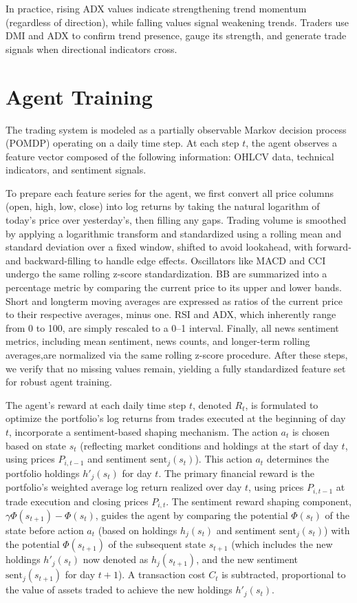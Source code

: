 In practice, rising \gls{ADX} values indicate strengthening trend momentum (regardless of direction), while falling values signal weakening trends. Traders use \gls{DMI} and \gls{ADX} to confirm trend presence, gauge its strength, and generate trade signals when directional indicators cross.

\section{Agent Training}
The trading system is modeled as a partially observable Markov decision process (POMDP) operating on a daily time step. At each step \(t\), the agent observes a feature vector composed of the following information: \gls{OHLCV} data, technical indicators, and sentiment signals. 

To prepare each feature series for the agent, we first convert all price columns (open, high, low, close) into log returns by taking the natural logarithm of today’s price over yesterday’s, then filling any gaps. Trading volume is smoothed by applying a logarithmic transform and standardized using a rolling mean and standard deviation over a fixed window, shifted to avoid lookahead, with forward- and backward-filling to handle edge effects. Oscillators like \gls{MACD} and \gls{CCI} undergo the same rolling z-score standardization. \gls{BB} are summarized into a percentage metric by comparing the current price to its upper and lower bands. Short and longterm moving averages are expressed as ratios of the current price to their respective averages, minus one. \gls{RSI} and \gls{ADX}, which inherently range from 0 to 100, are simply rescaled to a 0–1 interval. Finally, all news sentiment metrics, including mean sentiment, news counts, and longer-term rolling averages,are normalized via the same rolling z-score procedure. After these steps, we verify that no missing values remain, yielding a fully standardized feature set for robust agent training.

The agent's reward at each daily time step \(t\), denoted \(R_t\), is formulated to optimize the portfolio's log returns from trades executed at the beginning of day \(t\), incorporate a sentiment-based shaping mechanism. The action \(a_t\) is chosen based on state \(s_t\) (reflecting market conditions and holdings at the start of day \(t\), using prices \(P_{i,t-1}\) and sentiment \(\text{sent}_j(s_t)\)). This action \(a_t\) determines the portfolio holdings \(h'_j(s_t)\) for day \(t\). The primary financial reward is the portfolio's weighted average log return realized over day \(t\), using prices \(P_{i,t-1}\) at trade execution and closing prices \(P_{i,t}\). The sentiment reward shaping component, \( \gamma \Phi(s_{t+1}) - \Phi(s_t) \), guides the agent by comparing the potential \(\Phi(s_t)\) of the state before action \(a_t\) (based on holdings \(h_j(s_t)\) and sentiment \(\text{sent}_j(s_t)\)) with the potential \(\Phi(s_{t+1})\) of the subsequent state \(s_{t+1}\) (which includes the new holdings \(h'_j(s_t)\) now denoted as \(h_j(s_{t+1})\), and the new sentiment \(\text{sent}_j(s_{t+1})\) for day \(t+1\)). A transaction cost \(C_t\) is subtracted, proportional to the value of assets traded to achieve the new holdings \(h'_j(s_t)\).

